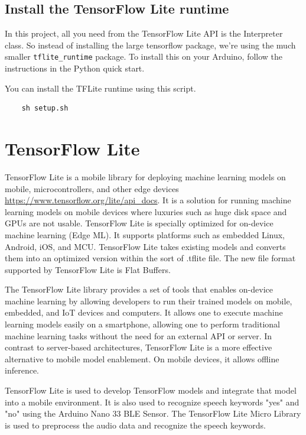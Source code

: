 \subsection{Install the TensorFlow Lite runtime}
In this project, all you need from the TensorFlow Lite API is the Interpreter class. So instead of installing the large tensorflow package, we're using the much smaller \texttt{tflite\_runtime} package.
To install this on your Arduino, follow the instructions in the Python quick start.

You can install the TFLite runtime using this script.

\begin{verbatim}
	sh setup.sh
\end{verbatim}

\section{TensorFlow Lite}
TensorFlow Lite is a mobile library for deploying machine learning models on mobile, microcontrollers, and other edge devices \url{https://www.tensorflow.org/lite/api_docs}. It is a solution for running machine learning models on mobile devices where luxuries such as huge disk space and GPUs are not usable. TensorFlow Lite is specially optimized for on-device machine learning (Edge ML). It supports platforms such as embedded Linux, Android, iOS, and MCU. TensorFlow Lite takes existing models and converts them into an optimized version within the sort of .tflite file. The new file format supported by TensorFlow Lite is Flat Buffers.

The TensorFlow Lite library provides a set of tools that enables on-device machine learning by allowing developers to run their trained models on mobile, embedded, and IoT devices and computers. It allows one to execute machine learning models easily on a smartphone, allowing one to perform traditional machine learning tasks without the need for an external API or server. In contrast to server-based architectures, TensorFlow Lite is a more effective alternative to mobile model enablement. On mobile devices, it allows offline inference.

TensorFlow Lite is used to develop TensorFlow models and integrate that model into a mobile environment\cite{Boesch:2021}. It is also used to recognize speech keywords "yes" and "no" using the Arduino Nano 33 BLE Sensor. The TensorFlow Lite Micro Library is used to preprocess the audio data and recognize the speech keywords.

